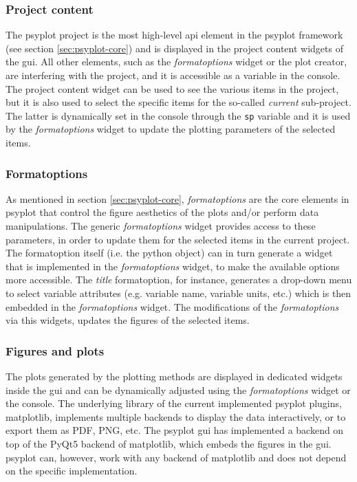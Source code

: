 \documentclass[
11pt, %
english, %
singlespacing, %
headsepline, %
]{article} %
\begin{document}
\begin{refsection}
\subsubsection{Project content}
The psyplot project is the most high-level \gls{api} element in the psyplot framework (see section \ref{sec:psyplot-core}) and is displayed in the project content widgets of the \gls{gui}. All other elements, such as the \textit{formatoptions} widget or the plot creator, are interfering with the project, and it is accessible as a variable in the console. The project content widget can be used to see the various items in the project, but it is also used to select the specific items for the so-called \textit{current} sub-project. The latter is dynamically set in the console through the \texttt{sp} variable and it is used by the \textit{formatoptions} widget to update the plotting parameters of the selected items.

\subsubsection{Formatoptions}
As mentioned in section \ref{sec:psyplot-core}, \textit{formatoptions} are the core elements in psyplot that control the figure aesthetics of the plots and/or perform data manipulations. The generic \textit{formatoptions} widget provides access to these parameters, in order to update them for the selected items in the current project. The formatoption itself (i.e. the python object) can in turn generate a widget that is implemented in the \textit{formatoptions} widget, to make the available options more accessible. The \textit{title} formatoption, for instance, generates a drop-down menu to select variable attributes (e.g. variable name, variable units, etc.) which is then embedded in the \textit{formatoptions} widget. The modifications of the \textit{formatoptions} via this widgets, updates the figures of the selected items.

\subsubsection{Figures and plots}
The plots generated by the plotting methods are displayed in dedicated widgets inside the \gls{gui} and can be dynamically adjusted using the \textit{formatoptions} widget or the console. The underlying library of the current implemented psyplot plugins, matplotlib, implements multiple backends to display the data interactively, or to export them as PDF, PNG, etc. The psyplot \gls{gui} has implemented a backend on top of the PyQt5 backend of matplotlib, which embeds the figures in the \gls{gui}. psyplot can, however, work with any backend of matplotlib and does not depend on the specific implementation.


\end{refsection}
\end{document}
